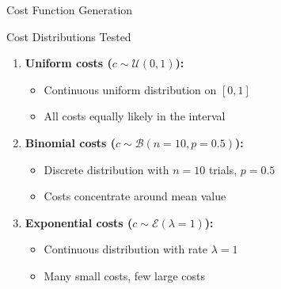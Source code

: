 \documentclass[aspectratio=169]{beamer}
\begin{document}
\begin{frame}{Cost Function Generation}
\begin{block}{Cost Distributions Tested}
\begin{enumerate}
    \item \textbf{Uniform costs ($c \sim \mathcal{U}(0,1)$):}
    \begin{itemize}
        \item Continuous uniform distribution on $[0, 1]$
        \item All costs equally likely in the interval
    \end{itemize}
    
    \pause
    
    \item \textbf{Binomial costs ($c \sim \mathcal{B}(n=10, p=0.5)$):}
    \begin{itemize}
        \item Discrete distribution with $n=10$ trials, $p=0.5$
        \item Costs concentrate around mean value
    \end{itemize}
    
    \pause
    
    \item \textbf{Exponential costs ($c \sim \mathcal{E}(\lambda=1)$):}
    \begin{itemize}
        \item Continuous distribution with rate $\lambda = 1$
        \item Many small costs, few large costs
    \end{itemize}
\end{enumerate}
\end{block}

\end{frame}
\end{document}
